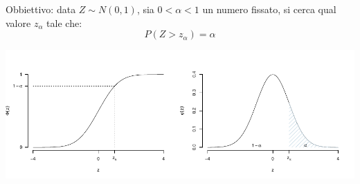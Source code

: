 \documentclass[
  11pt,
]{book}
\theoremstyle{mytheoremstyle}
\theoremstyle{mydefstyle}
\begin{document}
Obbiettivo: data \(Z\sim N(0,1)\), sia \(0<\alpha<1\) un numero fissato, si cerca qual valore \(z_\alpha\) tale che:
\[P(Z > z_\alpha)=\alpha\]

\begin{center}\includegraphics{Appunti_di_Statistica_2025_files/figure-latex/07c-Normale-27,-1} \end{center}
\end{document}
